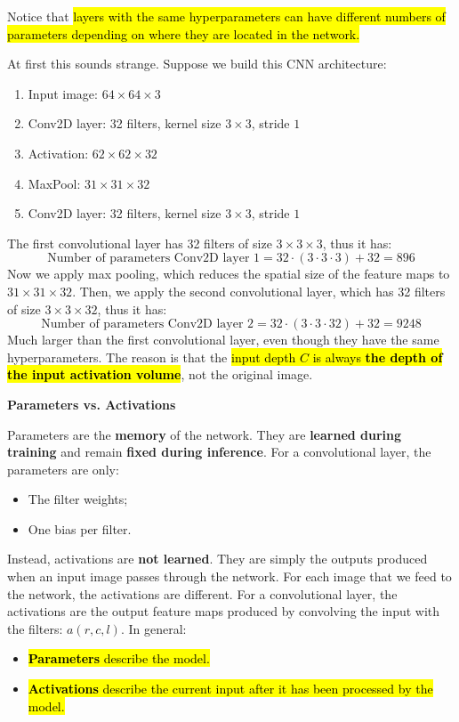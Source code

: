 Notice that \hl{layers with the same hyperparameters can have different numbers of parameters depending on where they are located in the network.}

\highspace
At first this sounds strange. Suppose we build this CNN architecture:
\begin{enumerate}
    \item Input image: $64 \times 64 \times 3$
    \item Conv2D layer: 32 filters, kernel size $3 \times 3$, stride $1$
    \item Activation: $62 \times 62 \times 32$
    \item MaxPool: $31 \times 31 \times 32$
    \item Conv2D layer: 32 filters, kernel size $3 \times 3$, stride $1$
\end{enumerate}
The first convolutional layer has 32 filters of size $3 \times 3 \times 3$, thus it has:
\begin{equation*}
    \text{Number of parameters Conv2D layer 1} = 32 \cdot (3 \cdot 3 \cdot 3) + 32 = 896
\end{equation*}
Now we apply max pooling, which reduces the spatial size of the feature maps to $31 \times 31 \times 32$. Then, we apply the second convolutional layer, which has 32 filters of size $3 \times 3 \times 32$, thus it has:
\begin{equation*}
    \text{Number of parameters Conv2D layer 2} = 32 \cdot (3 \cdot 3 \cdot 32) + 32 = 9248
\end{equation*}
Much larger than the first convolutional layer, even though they have the same hyperparameters. The reason is that the \hl{input depth $C$ is always \textbf{the depth of the input activation volume}}, not the original image.

\highspace
\begin{flushleft}
    \textcolor{Green3}{ \textbf{Parameters vs. Activations}}
\end{flushleft}
Parameters are the \textbf{memory} of the network. They are \textbf{learned during training} and remain \textbf{fixed during inference}. For a convolutional layer, the parameters are only:
\begin{itemize}
    \item The filter weights;
    \item One bias per filter.
\end{itemize}
Instead, activations are \textbf{not learned}. They are simply the outputs produced when an input image passes through the network. For each image that we feed to the network, the activations are different. For a convolutional layer, the activations are the output feature maps produced by convolving the input with the filters: $a(r,c,l)$. In general:
\begin{itemize}
    \item \hl{\textbf{Parameters} describe the model.}
    \item \hl{\textbf{Activations} describe the current input after it has been processed by the model.}
\end{itemize}

